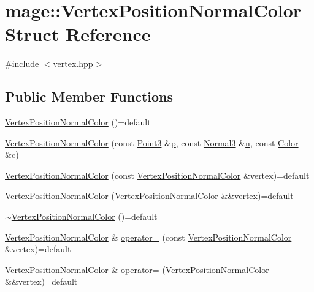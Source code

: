 \hypertarget{structmage_1_1_vertex_position_normal_color}{}\section{mage\+:\+:Vertex\+Position\+Normal\+Color Struct Reference}
\label{structmage_1_1_vertex_position_normal_color}


{\ttfamily \#include $<$vertex.\+hpp$>$}

\subsection*{Public Member Functions}
\begin{DoxyCompactItemize}
\item 
\hyperlink{structmage_1_1_vertex_position_normal_color_a8c8eff8f2fc3520bec482e89e2b32119}{Vertex\+Position\+Normal\+Color} ()=default
\item 
\hyperlink{structmage_1_1_vertex_position_normal_color_a1e0518d632c45c88d5328c1ae1f549a9}{Vertex\+Position\+Normal\+Color} (const \hyperlink{structmage_1_1_point3}{Point3} \&\hyperlink{structmage_1_1_vertex_position_normal_color_a6847c367ca68fb8d8e349c8441ae63dd}{p}, const \hyperlink{structmage_1_1_normal3}{Normal3} \&\hyperlink{structmage_1_1_vertex_position_normal_color_a771c7e71e8b6441b73f513f511507650}{n}, const \hyperlink{structmage_1_1_color}{Color} \&\hyperlink{structmage_1_1_vertex_position_normal_color_a0d170b26a78b179330ae282ce97a036b}{c})
\item 
\hyperlink{structmage_1_1_vertex_position_normal_color_ad9fd4fa7c1da6aaf70f8241d3c7f261c}{Vertex\+Position\+Normal\+Color} (const \hyperlink{structmage_1_1_vertex_position_normal_color}{Vertex\+Position\+Normal\+Color} \&vertex)=default
\item 
\hyperlink{structmage_1_1_vertex_position_normal_color_aa2576c4e552f638bab84a715d1b53ea3}{Vertex\+Position\+Normal\+Color} (\hyperlink{structmage_1_1_vertex_position_normal_color}{Vertex\+Position\+Normal\+Color} \&\&vertex)=default
\item 
\hyperlink{structmage_1_1_vertex_position_normal_color_a4c51d0599843601d1cc1a6a55149aafe}{$\sim$\+Vertex\+Position\+Normal\+Color} ()=default
\item 
\hyperlink{structmage_1_1_vertex_position_normal_color}{Vertex\+Position\+Normal\+Color} \& \hyperlink{structmage_1_1_vertex_position_normal_color_aff39199b81977d3479976c83f7f51a4f}{operator=} (const \hyperlink{structmage_1_1_vertex_position_normal_color}{Vertex\+Position\+Normal\+Color} \&vertex)=default
\item 
\hyperlink{structmage_1_1_vertex_position_normal_color}{Vertex\+Position\+Normal\+Color} \& \hyperlink{structmage_1_1_vertex_position_normal_color_a81420d3cad27061049fe23bf4aaba64f}{operator=} (\hyperlink{structmage_1_1_vertex_position_normal_color}{Vertex\+Position\+Normal\+Color} \&\&vertex)=default
\end{DoxyCompactItemize}
